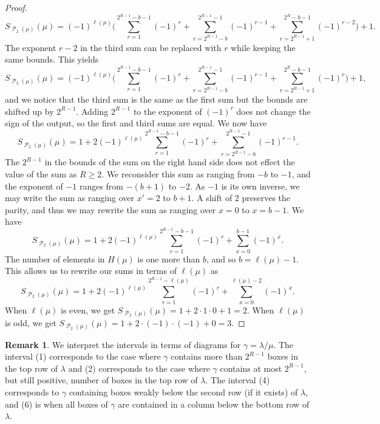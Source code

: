 \documentclass[12pt]{amsart}
\theoremstyle{definition}
\newtheorem{remark}[theorem]{Remark}
\numberwithin{equation}{section}
\newcommand{\la}{\lambda}
\DeclareMathOperator{\p}{\mathcal{P}}
\begin{document}
\begin{proof}
\[
 S_{\p_2(\mu)}({\mu}) = (-1)^{\ell(\mu)} \Bigg(\sum\limits_{r = 1}^{2^{R-1}-b-1} (-1)^{r} + \sum\limits_{r = 2^{R-1}-b}^{2^{R-1}-1} (-1)^{r-1} + \sum\limits_{r=2^{R-1} +1}^{2^{R}-b-1} (-1)^{r-2}\Bigg) + 1.
\]
The exponent $r-2$ in the third sum can be replaced with $r$ while keeping the same bounds. This yields
\[
 S_{\p_2(\mu)}({\mu}) = (-1)^{\ell(\mu)} \Bigg(\sum\limits_{r = 1}^{2^{R-1}-b-1} (-1)^{r} + \sum\limits_{r = 2^{R-1}-b}^{2^{R-1}-1} (-1)^{r-1} + \sum\limits_{r=2^{R-1} +1}^{2^{R}-b-1} (-1)^{r}\Bigg) + 1,
\]
and we notice that the third sum is the same as the first sum but the bounds are shifted up by $2^{R-1}$. Adding $2^{R-1}$ to the exponent of $(-1)^r$ does not change the sign of the output, so the first and third sums are equal. We now have 
\[
S_{\p_2(\mu)}({\mu})  = 1 + 2(-1)^{\ell(\mu)}\sum\limits_{r = 1}^{2^{R-1}-b - 1} (-1)^{r} + \sum\limits_{r = 2^{R-1}-b}^{2^{R-1}-1} (-1)^{r-1}.
\]
The $2^{R-1}$ in the bounds of the sum on the right hand side does not effect the value of the sum as $R\geq 2$. We reconsider this sum as ranging from $-b$ to $-1$, and the exponent of $-1$ ranges from $-(b+1)$ to $-2$. As $-1$ is its own inverse, we may write the sum as ranging over $x' = 2$ to $b+1$. A shift of 2 preserves the parity, and thus we may rewrite the sum as ranging over $x = 0$ to $x = b-1$.
We have 
\[
S_{\p_2(\mu)}({\mu})  = 1 + 2(-1)^{\ell(\mu)}\sum\limits_{r = 1}^{2^{R-1}-b - 1} (-1)^{r} + \sum\limits_{x=0}^{b-1} (-1)^{x}.
\]
The number of elements in $H(\mu)$ is one more than $b$, and so $b=\ell(\mu)-1$. This allows us to rewrite our sums in terms of $\ell(\mu)$ as
\[
S_{\p_2(\mu)}({\mu})  = 1 + 2(-1)^{\ell(\mu)}\sum\limits_{r = 1}^{2^{R-1}-\ell(\mu)} (-1)^{r} + \sum\limits_{x=0}^{\ell(\mu) - 2} (-1)^x.
\]
When $\ell(\mu)$ is even, we get $S_{\p_2(\mu)}({\mu}) = 1 + 2\cdot 1\cdot 0 + 1 = 2$. When $\ell(\mu)$ is odd, we get $S_{\p_2(\mu)}({\mu})  = 1 + 2\cdot (-1) \cdot (-1) + 0 = 3$.
\end{proof}
\begin{remark}
We interpret the intervals in terms of diagrams for $\gamma = \la/\mu$. The interval (1) corresponds to the case where $\gamma$ contains more than $2^{R-1}$ boxes in the top row of $\la$ and (2) corresponds to the case where $\gamma$ contains at most $2^{R-1}$, but still positive, number of boxes in the top row of $\la$. The interval (4) corresponds to $\gamma$ containing boxes weakly below the second row (if it exists) of $\la$, and (6) is when all boxes of $\gamma$ are contained in a column below the bottom row of $\la$.
\end{remark}
\end{document}
